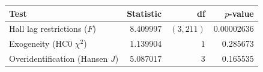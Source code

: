 \begin{tabular}{lrrr}
\toprule
Test & Statistic & df & $p$-value \\
\midrule
Hall lag restrictions ($F$) & 8.409997 & $(3,211)$ & 0.00002636 \\
Exogeneity (HC0 $\chi^2$) & 1.139904 & $1$ & 0.285673 \\
Overidentification (Hansen $J$) & 5.087017 & $3$ & 0.165535 \\
\bottomrule
\end{tabular}
